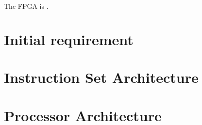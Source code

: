The FPGA is .


\section {Initial requirement}
     \label{fpga:section:initial_requirements}

\section{Instruction Set Architecture} \label{fpga:isa:s:isa}
    

\section {Processor Architecture}
     \label{fpga:section:cpu_architecture}
